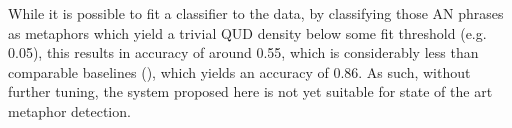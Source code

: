 \documentclass[10pt,letterpaper,twocolumn]{article}
\begin{document}
While it is possible to fit a classifier to the data, by classifying those AN phrases as metaphors which yield a trivial QUD density below some fit threshold (e.g. 0.05), this results in accuracy of around 0.55, which is considerably less than comparable baselines (\cite{tsvetkov2014metaphor}), which yields an accuracy of 0.86. As such, without further tuning, the system proposed here is not yet suitable for state of the art metaphor detection.










%
\end{document}
